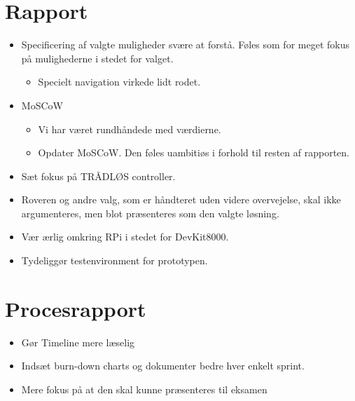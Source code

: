 \section{Rapport}
\begin{itemize}
	\item Specificering af valgte muligheder svære at forstå. Føles som for meget fokus på mulighederne i stedet for valget.
	\begin{itemize}
		\item Specielt navigation virkede lidt rodet.
	\end{itemize}
	\item MoSCoW
		\begin{itemize}
			\item Vi har været rundhåndede med værdierne.
			\item Opdater MoSCoW. Den føles uambitiøs i forhold til resten af rapporten.
		\end{itemize}
	\item Sæt fokus på TRÅDLØS controller.
	\item Roveren og andre valg, som er håndteret uden videre overvejelse, skal ikke argumenteres, men blot præsenteres som den valgte løsning.
	\item Vær ærlig omkring RPi i stedet for DevKit8000.
	\item Tydeliggør testenvironment for prototypen.
\end{itemize}

\section{Procesrapport}
\begin{itemize}
	\item Gør Timeline mere læselig
	\item Indsæt burn-down charts og dokumenter bedre hver enkelt sprint.
	\item Mere fokus på at den skal kunne præsenteres til eksamen
\end{itemize}

